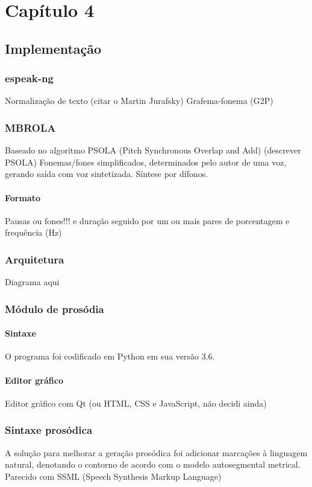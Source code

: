 
\chapter{Capítulo 4}

\section{Implementação}
\subsection{espeak-ng}
Normalização de texto (citar o Martin Jurafsky)
Grafema-fonema (G2P)
\subsection{MBROLA}
Baseado no algoritmo PSOLA (Pitch Synchronous Overlap and Add) (descrever PSOLA)
Fonemas/fones simplificados, determinados pelo autor de uma voz, gerando saída
com voz sintetizada. Síntese por dífonos.
\subsubsection{Formato}
Pausas ou fones!!! e duração seguido por um ou mais pares de porcentagem e frequência (Hz)
\subsection{Arquitetura}
Diagrama aqui
\subsection{Módulo de prosódia}
\subsubsection{Sintaxe}
O programa foi codificado em Python em sua versão 3.6.
\subsubsection{Editor gráfico}
Editor gráfico com Qt (ou HTML, CSS e JavaScript, não decidi ainda)
\subsection{Sintaxe prosódica}
A solução para melhorar a geração prosódica foi adicionar marcações à linguagem
natural, denotando o contorno de acordo com o modelo autosegmental metrical.
Parecido com SSML (Speech Synthesis Markup Language)

